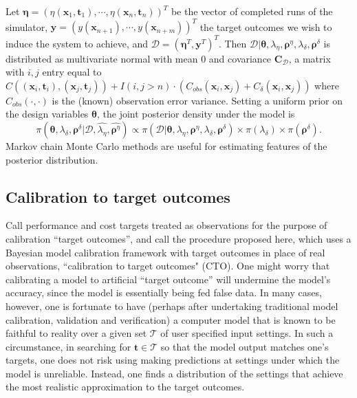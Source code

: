 \documentclass[12pt]{article}
\begin{document}
Let $\boldsymbol \eta = (\eta(\mathbf x_1,\mathbf t_1),\cdots,\eta(\mathbf x_n,\mathbf t_n))^T$ be the vector of completed runs of the simulator, $\mathbf y = (y(\mathbf x_{n+1}),\cdots,y(\mathbf x_{n+m}))^T$ the target outcomes we wish to induce the system to achieve, 
and $\mathcal D = (\boldsymbol \eta^T,\mathbf y^T)^T$.
%
Then $\mathcal D | \boldsymbol \theta,\lambda_\eta, \boldsymbol \rho^\eta,\lambda_\delta,\boldsymbol \rho^\delta$ is distributed as multivariate normal with mean 0 and covariance $\mathbf C_\mathcal D$, a matrix with $i,j$ entry equal to 
$
C((\mathbf x_i,\mathbf t_i),(\mathbf x_j,\mathbf t_j)) + I(i,j>n)\cdot(C_{obs}(\mathbf x_i,\mathbf x_j) + C_\delta(\mathbf x_i,\mathbf x_j))
$
where $C_{obs}(\cdot,\cdot)$ is the (known) observation error variance.
%
Setting a uniform prior on the design variables $\boldsymbol\theta$, the joint posterior density under the model is
%
\begin{equation} \label{eq:full_dist}
\pi(\boldsymbol \theta,\lambda_\delta,\boldsymbol \rho^\delta|\mathcal D,\widehat{\lambda_\eta},\widehat{\boldsymbol \rho^\eta})
\propto \pi(\mathcal D | \boldsymbol \theta,\lambda_\eta, \boldsymbol \rho^\eta,\lambda_\delta,\boldsymbol \rho^\delta) \times %
\pi(\lambda_\delta) \times \pi(\boldsymbol \rho^\delta).
\end{equation}
%
Markov chain Monte Carlo methods are useful for estimating features of the posterior distribution.

\subsection{Calibration to target outcomes}

%
Call performance and cost targets treated as observations for the purpose of calibration ``target outcomes'', and call the procedure proposed here, which uses a Bayesian model calibration framework with target outcomes in place of real observations, ``calibration to target outcomes" (CTO). 
%
One might worry that calibrating a model to artificial ``target outcome'' will undermine the model's accuracy, since the model is essentially being fed false data.
%
%
In many cases, however, one is fortunate to have (perhaps after undertaking traditional model calibration, validation and verification) a computer model that is known to be faithful to reality over a given set $\mathcal T$ of user specified input settings.
%
In such a circumstance, in searching for $\mathbf t\in\mathcal T$ so that the model output matches one's targets, one does not risk using making predictions at settings under which the model is unreliable. 
%
Instead, one finds a distribution of the settings that achieve the most realistic approximation to the target outcomes.
\end{document}
